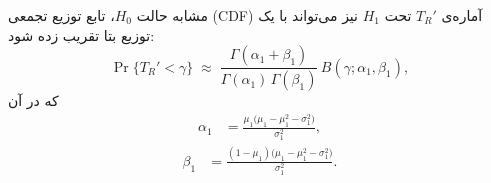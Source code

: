مشابه حالت $H_{0}$، تابع توزیع تجمعی (CDF) آماره‌ی $T_{R}'$ تحت $H_{1}$ نیز می‌تواند با یک توزیع بتا تقریب زده شود:
\begin{equation}
	\Pr\{T_{R}' < \gamma\} \;\approx\;
	\frac{\Gamma(\alpha_{1}+\beta_{1})}{\Gamma(\alpha_{1})\,\Gamma(\beta_{1})}\,
	B(\gamma;\alpha_{1},\beta_{1}), \label{eq:beta_approx2}
\end{equation}
که در آن
\begin{align}
	\alpha_{1}&=\frac{\mu_{1}\big(\mu_{1}-\mu_{1}^{2}-\sigma_{1}^{2}\big)}{\sigma_{1}^{2}},
\end{align}
\begin{align}
	\beta_{1}&=\frac{(1-\mu_{1})\big(\mu_{1}-\mu_{1}^{2}-\sigma_{1}^{2}\big)}{\sigma_{1}^{2}}.
\end{align}
